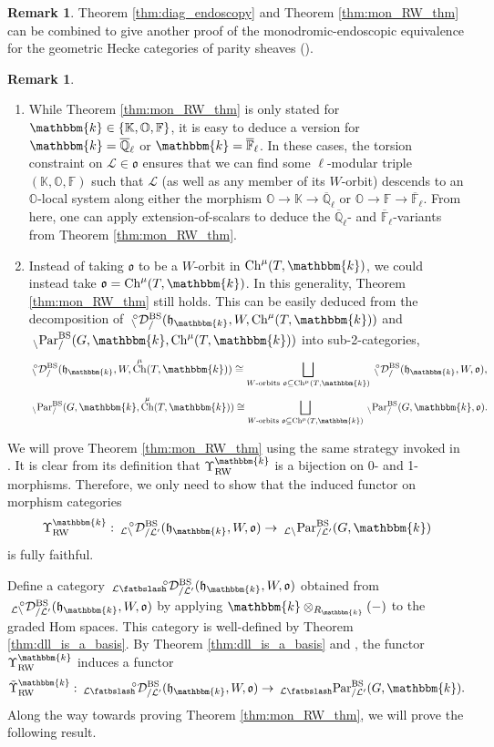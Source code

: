 \documentclass{amsart}
\newcommand{\Q}{\mathbb{Q}}
\newcommand{\F}{\mathbb{F}}
\renewcommand{\O}{\mathbb{O}}
\newcommand{\K}{\mathbb{K}}
\renewcommand{\k}{\mathbbm{k}}
\newcommand{\scrL}{\mathcal{L}}
\DeclareMathOperator{\Ch}{Ch}
\newcommand{\fr}[1]{\mathfrak{#1}}
\DeclareMathOperator{\RW}{RW}
\DeclareMathOperator{\BS}{BS}
\newcommand{\PME}[2]{\:_{#1 \smallleftdash} \textnormal{Par}_{/ #2} }
\newcommand{\PEE}[2]{\:_{#1 \backslash} \textnormal{Par}_{/ #2} }
\newcommand{\grEWmon}[2]{\:_{#1 \backslash} \!\! {}^{\circ} \mathcal{D}_{/ #2} }
\newcommand{\grEWmonME}[2]{\:_{#1 \smallleftdash} \!\!{}^{\circ} \mathcal{D}_{/ #2} }
\newcommand{\bfslash}{\mathbin{\fatbslash}}
\newcommand*\smallleftdash{\bfslash}
\theoremstyle{definition}
\newtheorem{remark}[subsubsection]{Remark}
\numberwithin{equation}{subsection}
\begin{document}
\begin{remark}
    Theorem \ref{thm:diag_endoscopy} and Theorem \ref{thm:mon_RW_thm} can be combined to give another proof of the monodromic-endoscopic equivalence for the geometric Hecke categories of parity sheaves (\cite[Theorem 5.11.1]{Sandvik}).
\end{remark}

\begin{remark}
  \begin{enumerate}
    \item While Theorem \ref{thm:mon_RW_thm} is only stated for $\k \in \{\K, \O, \F\}$, it is easy to deduce a version for $\k = \overline{\Q}_{\ell}$ or $\k = \overline{\F}_{\ell}$.
  In these cases, the torsion constraint on $\scrL \in \fr{o}$ ensures that we can find some $\ell$-modular triple $(\K, \O, \F)$ such that $\scrL$ (as well as any member of its $W$-orbit) descends to an $\O$-local system along either the morphism $\O \to \K \to \overline{\Q}_{\ell}$ or $\O \to \F \to \overline{\F}_{\ell}$.
  From here, one can apply extension-of-scalars to deduce the $\overline{\Q}_{\ell}$- and $\overline{\F}_{\ell}$-variants from Theorem \ref{thm:mon_RW_thm}.
    \item Instead of taking $\fr{o}$ to be a $W$-orbit in $\Ch^{\mu} (T, \k)$, we could instead take $\fr{o} = \Ch^{\mu} (T, \k)$. In this generality, Theorem \ref{thm:mon_RW_thm} still holds.
    This can be easily deduced from the decomposition of $\grEWmon{}{}^{\BS} (\fr{h}_{\k}, W, \Ch^{\mu} (T, \k))$ and $\PEE{}{}^{\BS} (G, \k, \Ch^{\mu} (T, \k))$ into sub-2-categories,
    \[\grEWmon{}{}^{\BS} (\fr{h}_{\k}, W, \Ch^{\mu} (T, \k)) \cong \bigsqcup_{W \text{-orbits } \fr{o} \subseteq \Ch^{\mu} (T, \k)} \grEWmon{}{}^{\BS} (\fr{h}_{\k}, W, \fr{o}),\]
    \[\PEE{}{}^{\BS} (G, \k, \Ch^{\mu} (T, \k)) \cong \bigsqcup_{W \text{-orbits } \fr{o} \subseteq \Ch^{\mu} (T, \k)} \PEE{}{}^{\BS} (G, \k, \fr{o}).\]
\end{enumerate}  
\end{remark}


We will prove Theorem \ref{thm:mon_RW_thm} using the same strategy invoked in \cite[Theorem 5.3.1]{Sandvik}. 
It is clear from its definition that $\Upsilon_{\RW}^{\k}$ is a bijection on 0- and 1-morphisms.
Therefore, we only need to show that the induced functor on morphism categories
\[\Upsilon_{\RW}^{\k} : \grEWmon{\scrL}{\scrL'}^{\BS} (\fr{h}_{\k}, W, \fr{o}) \to \PEE{\scrL}{\scrL'}^{\BS} (G, \k)\]
is fully faithful. 

Define a category $\grEWmonME{\scrL}{\scrL'}^{\BS} (\fr{h}_{\k}, W, \fr{o})$ obtained from $\grEWmon{\scrL}{\scrL'}^{\BS} (\fr{h}_{\k}, W, \fr{o})$ by applying $\k \otimes_{R_{\k}} (-)$ to the graded Hom spaces.
This category is well-defined by Theorem \ref{thm:dll_is_a_basis}.
By Theorem \ref{thm:dll_is_a_basis} and \cite[Lemma 3.6.3]{Sandvik}, the functor $\Upsilon_{\RW}^{\k}$ induces a functor
\[\tilde{\Upsilon}_{\RW}^{\k} : \grEWmonME{\scrL}{\scrL'}^{\BS} (\fr{h}_{\k}, W, \fr{o}) \to \PME{\scrL}{\scrL'}^{\BS} (G, \k).\]
Along the way towards proving Theorem \ref{thm:mon_RW_thm}, we will prove the following result.
\end{document}
